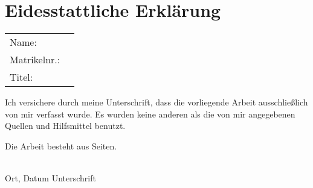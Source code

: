 
\section*{Eidesstattliche Erklärung}

\begin{table}[h]
\begin{tabularx}{\textwidth}{l X}
Name:			& \@author \\
Matrikelnr.:	& \Matrikelnummer \\
Titel:			& \@title

				\titleEnglish \\
\end{tabularx}
\end{table}

Ich versichere durch meine Unterschrift, dass die vorliegende Arbeit
ausschließlich von mir verfasst wurde.
Es wurden keine anderen als die von mir angegebenen Quellen und Hilfsmittel
benutzt.

Die Arbeit besteht aus \underline{\hspace{3em}} Seiten.

\vspace{8ex}
\begin{tabbing}
\underline{\hspace{14em}} \hspace{3em}\= \underline{\hspace{14em}} \\
Ort, Datum \> Unterschrift
\end{tabbing}





\clearpage




